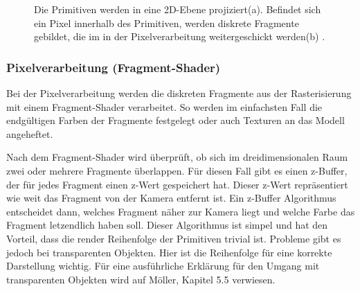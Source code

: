 \begin{figure}[hbt!]
    \centering
    \qquad
    \caption{Die Primitiven werden in eine 2D-Ebene projiziert(a). Befindet sich ein Pixel innerhalb des Primitiven, werden diskrete Fragmente gebildet, die im in der Pixelverarbeitung weitergeschickt werden(b) \cite*[][, zuletzt aufgerufen am 11.07.2022]{scratchapixel}.}%
    \label{fig:rendering-pipeline-rasterisierung-beispiel}
\end{figure}

\subsubsection{Pixelverarbeitung (Fragment-Shader)}
\label{grp-pixelverarbeitung}
Bei der Pixelverarbeitung werden die diskreten Fragmente aus der Rasterisierung mit einem Fragment-Shader verarbeitet. So werden im einfachsten Fall die endgültigen Farben der Fragmente festgelegt oder auch Texturen an das Modell angeheftet. 

Nach dem Fragment-Shader wird überprüft, ob sich im dreidimensionalen Raum zwei oder mehrere Fragmente überlappen. Für diesen Fall gibt es einen z-Buffer, der für jedes Fragment einen z-Wert gespeichert hat. Dieser z-Wert repräsentiert wie weit das Fragment von der Kamera entfernt ist. Ein z-Buffer Algorithmus entscheidet dann, welches Fragment näher zur Kamera liegt und welche Farbe das Fragment letzendlich haben soll. Dieser Algorithmus ist simpel und hat den Vorteil, dass die render Reihenfolge der Primitiven trivial ist. Probleme gibt es jedoch bei transparenten Objekten. Hier ist die Reihenfolge für eine korrekte Darstellung wichtig\cite*[Moeller (2019) S.21f.,][]{moeller2019}. Für eine ausführliche Erklärung für den Umgang mit transparenten Objekten wird auf Möller, Kapitel 5.5 verwiesen\cite*[Moeller (2019) S.148ff.,][]{moeller2019}.